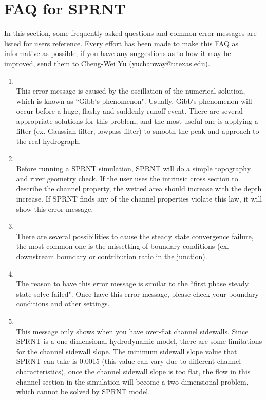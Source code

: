 \documentclass[12pt, letterpaper]{article}
\begin{document}
\section{FAQ for SPRNT}
\begin{flushleft} %
In this section, some frequently asked questions and common error messages are listed for users reference. Every effort has been made to make this FAQ as informative as possible; if you have any suggestions as to how it may be improved, send them to Cheng-Wei Yu (\url{yuchanway@utexas.edu}).
\begin{enumerate}
\item \textbf{\color{red}{[EE] Bummer: time step too small at time point XXX second.}}\\
This error message is caused by the oscillation of the numerical solution, which is known as ``Gibb`s phenomenon". Usually, Gibb`s phenomenon will occur before a huge, flashy and suddenly runoff event. There are several appropriate solutions for this problem, and the most useful one is applying a filter (ex. Gaussian filter, lowpass filter) to smooth the peak and approach to the real hydrograph.

\item \textbf{\color{red}{Bummer: wetted area specification in INTRINSIC x-section has to be monotonically increasing.}}\\
Before running a SPRNT simulation, SPRNT will do a simple topography and river geometry check. If the user uses the intrinsic cross section to describe the channel property, the wetted area should increase with the depth increase. If SPRNT finds any of the channel properties violate this law, it will show this error message.

\item \textbf{\color{red}{[EE]: first phase of steady-state solve failed.}}\\
There are several possibilities to cause the steady state convergence failure, the most common one is the missetting of boundary conditions (ex. downstream boundary or contribution ratio in the junction).

\item \textbf{\color{red}{[EE]: second phase of steady state solve failed.}}\\
The reason to have this error message is similar to the ``first phase steady state solve failed". Once have this error message, please check your boundary conditions and other settings.

\item \textbf{\color{red}{DBINTK error}}\\
This message only shows when you have over-flat channel sidewalls. Since SPRNT is a one-dimensional hydrodynamic model, there are some limitations for the channel sidewall slope. The minimum sidewall slope value that SPRNT can take is 0.0015 (this value can vary due to different channel characteristics), once the channel sidewall slope is too flat, the flow in this channel section in the simulation will become a two-dimensional problem, which cannot be solved by SPRNT model.


\end{enumerate}
\end{flushleft}
\end{document}
